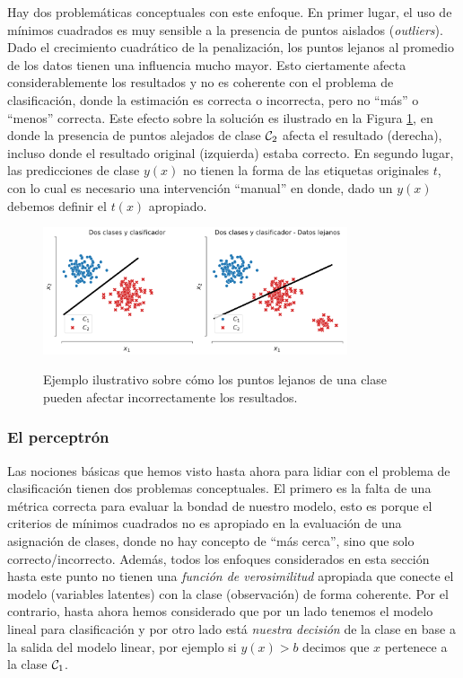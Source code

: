 \begin{remark} Hay dos problemáticas conceptuales con este enfoque. En primer lugar, el uso de mínimos cuadrados es muy sensible a la presencia de puntos aislados (\emph{outliers}). Dado el crecimiento cuadrático de la penalización, los puntos lejanos al promedio de los datos tienen una influencia mucho mayor. Esto ciertamente afecta considerablemente los resultados y no es coherente con el problema de clasificación, donde la estimación es correcta o incorrecta, pero no ``más'' o ``menos'' correcta. Este efecto sobre la solución es ilustrado en la Figura \ref{fig:clasif_mse}, en donde la presencia de puntos alejados de clase ${\mathcal C}_2$ afecta el resultado (derecha), incluso donde el resultado original (izquierda) estaba correcto. En segundo lugar, las predicciones de  clase  $y(x)$ no tienen la forma de las etiquetas originales $t$, con lo cual es necesario una intervención ``manual'' en donde, dado un $y(x)$ debemos definir el $t(x)$ apropiado. 
\end{remark}


\begin{figure}[H]
	\centering
	\includegraphics[width=0.8\textwidth]{img/cap3_dosclases_clasificador.pdf}\\
	\caption{Ejemplo ilustrativo sobre cómo los puntos lejanos de una clase pueden afectar incorrectamente los resultados.}
	\label{fig:clasif_mse}
\end{figure}

\subsubsection{El perceptrón}

Las nociones básicas que hemos visto hasta ahora para lidiar con el problema de clasificación tienen dos problemas conceptuales. El primero es la falta de una métrica correcta para evaluar la bondad de nuestro modelo,  esto es porque el criterios de mínimos cuadrados no es apropiado en la evaluación de una asignación de clases, donde no hay concepto de ``más cerca'', sino que solo correcto/incorrecto. Además, todos los enfoques considerados en esta sección hasta este punto no tienen una \emph{función de verosimilitud} apropiada que conecte el modelo (variables latentes) con la clase (observación) de forma coherente. Por el contrario, hasta ahora hemos considerado que por un lado tenemos el modelo lineal para clasificación y por otro lado está \emph{nuestra decisión} de la clase en base a la salida del modelo linear, por  ejemplo si $y(x)>b$ decimos que $x$ pertenece a la clase ${\mathcal C}_1$.\\


